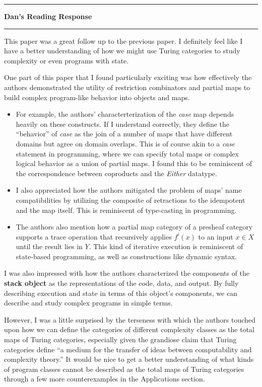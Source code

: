 \documentclass{amsart}
\newcommand{\iam}[1]{
  \vspace{0.25em}
  \hrule
  \vspace{0.25em}
  \textbf{{#1}'s Reading Response}
  \vspace{0.25em}
  \hrule
  \vspace{1em}
}
\begin{document}
\iam{Dan}

This paper was a great follow up to the previous paper. I definitely feel like I have a better understanding of how we might use Turing categories to study complexity or even programs with state.

One part of this paper that I found particularly exciting was how effectively the authors demonstrated the utility of restriction combinators and partial maps to build complex program-like behavior into objects and maps.
\begin{itemize}
\item For example, the authors' characterterization of the \textit{case} map depends heavily on these constructs. If I understand correctly, they define the ``behavior'' of \textit{case} as the join of a number of maps that have different domains but agree on domain overlaps. This is of course akin to a \textit{case} statement in programming, where we can specify total maps or complex logical behavior as a union of partial maps. I found this to be reminiscent of the correspondence between coproducts and the \textit{Either} datatype.
\item I also appreciated how the authors mitigated the problem of maps' name compatibilities by utilizing the composite of retractions to the idempotent and the map itself. This is reminiscent of type-casting in programming.
\item The authors also mention how a partial map category of a presheaf category supports a trace operation that recursively applies $f^{i}(x)$ to an input $x \in X$ until the result lies in $Y$. This kind of iterative execution is reminiscent of state-based programming, as well as constructions like dynamic syntax.
\end{itemize}

I was also impressed with how the authors characterized the components of the \textbf{stack object} as the representations of the code, data, and output. By fully describing execution and state in terms of this object's components, we can describe and study complex programs in simple terms.

However, I was a little surprised by the terseness with which the authors touched upon how we can define the categories of different complexity classes as the total maps of Turing categories, especially given the grandiose claim that Turing categories define ``a medium for the transfer of ideas between computability and complexity theory.'' It would be nice to get a better understanding of what kinds of program classes cannot be described as the total maps of Turing categories through a few more counterexamples in the Applications section.
\end{document}
